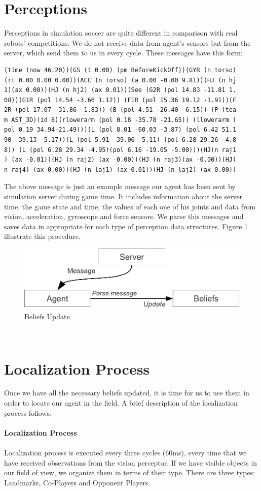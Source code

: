 \section{Perceptions}
Perceptions in simulation soccer are quite different in comparison with real robots' competitions. We do not receive data from agent's sensors but from the server, which send them to us in every cycle. These messages have this form:\\
\begin{verbatim}
(time (now 46.20))(GS (t 0.00) (pm BeforeKickOff))(GYR (n torso)
(rt 0.00 0.00 0.00))(ACC (n torso) (a 0.00 -0.00 9.81))(HJ (n hj
1)(ax 0.00))(HJ (n hj2) (ax 0.01))(See (G2R (pol 14.83 -11.81 1.
08))(G1R (pol 14.54 -3.66 1.12)) (F1R (pol 15.36 19.12 -1.91))(F
2R (pol 17.07 -31.86 -1.83)) (B (pol 4.51 -26.40 -6.15)) (P (tea
m AST_3D)(id 8)(rlowerarm (pol 0.18 -35.78 -21.65)) (llowerarm (
pol 0.19 34.94-21.49)))(L (pol 8.01 -60.03 -3.87) (pol 6.42 51.1
90 -39.13 -5.17))(L (pol 5.91 -39.06 -5.11) (pol 6.28-29.26 -4.8
8)) (L (pol 6.28 29.34 -4.95)(pol 6.16 -19.05 -5.00)))(HJ(n raj1
) (ax -0.01))(HJ (n raj2) (ax -0.00))(HJ (n raj3)(ax -0.00))(HJ(
n raj4) (ax 0.00))(HJ (n laj1) (ax 0.01))(HJ (n laj2) (ax 0.00))
\end{verbatim}
The above message is just an example message our agent has been sent by simulation server
during game time. It includes information about the server time, the game state and time, the values of each one of his joints and data from vision, acceleration, gyroscope and force sensors. We parse this messages and saves data in appropriate for each type of perception data structures. Figure \ref{fig:BeliefsUpdate} illustrate this procedure.
\begin{figure}[htb!]
\centering
  \includegraphics[scale=0.6]{Chapter3/figures/Message.pdf}
  \caption{Beliefs Update.} 
  \label{fig:BeliefsUpdate}
\end{figure}
\\


\section{Localization Process}
Once we have all the necessary beliefs updated, it is time for us to use them in order to locate our agent in the field. A brief description of the localization process follows.\\
\\
{\bf Localization Process} \cite{Localization}\\
\\
Localization process is executed every three cycles (60ms), every time that we have received observations from the vision perceptor. If we have visible objects in our field of view, we organize them in terms of their type. There are three types: Landmarks, Co-Players and Opponent Players. 

